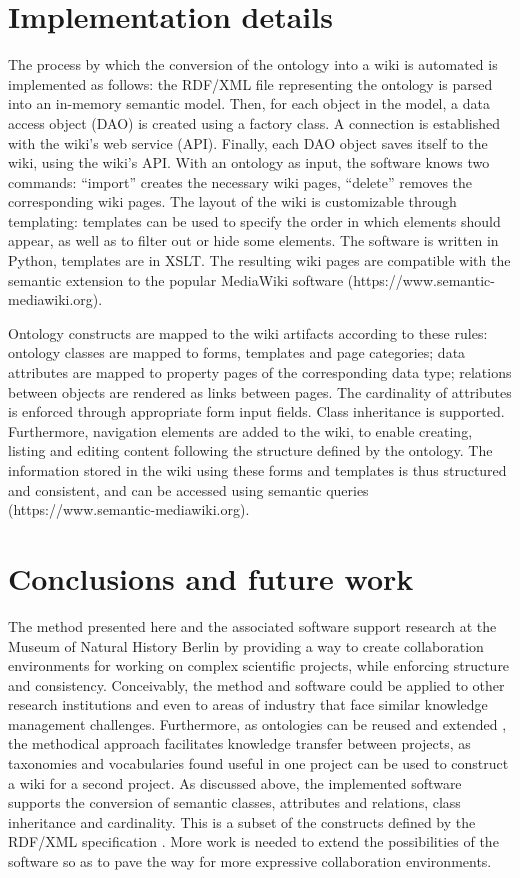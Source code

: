 \documentclass{ijcs_template}
\begin{document}
\section{Implementation details}
The process by which the conversion of the ontology into a wiki is automated is implemented as follows: the RDF/XML file representing the ontology is parsed into an in-memory semantic model. Then, for each object in the model, a data access object (DAO) is created using a factory class. A connection is established with the wiki's web service (API). Finally, each DAO object saves itself to the wiki, using the wiki's API. With an ontology as input, the software knows two commands: ``import'' creates the necessary wiki pages, ``delete'' removes the corresponding wiki pages. The layout of the wiki is customizable through templating: templates can be used to specify the order in which elements should appear, as well as to filter out or hide some elements. The software is written in Python, templates are in XSLT. The resulting wiki pages are compatible with the semantic extension to the popular MediaWiki software (https://www.semantic-mediawiki.org).

Ontology constructs are mapped to the wiki artifacts according to these rules: ontology classes are mapped to forms, templates and page categories; data attributes are mapped to property pages of the corresponding data type; relations between objects are rendered as links between pages. The cardinality of attributes is enforced through appropriate form input fields. Class inheritance is supported. Furthermore, navigation elements are added to the wiki, to enable creating, listing and editing content following the structure defined by the ontology. The information stored in the wiki using these forms and templates is thus structured and consistent, and can be accessed using semantic queries (https://www.semantic-mediawiki.org).

\section{Conclusions and future work}
The method presented here and the associated software support research at the Museum of Natural History Berlin by providing a way to create collaboration environments for working on complex scientific projects, while enforcing structure and consistency. Conceivably, the method and software could be applied to other research institutions and even to areas of industry that face similar knowledge management challenges. Furthermore, as ontologies can be reused and extended \cite{noy2001}, the methodical approach facilitates knowledge transfer between projects, as taxonomies and vocabularies found useful in one project can be used to construct a wiki for a second project. As discussed above, the implemented software supports the conversion of semantic classes, attributes and relations, class inheritance and cardinality. This is a subset of the constructs defined by the RDF/XML specification \cite{musen2015}. More work is needed to extend the possibilities of the software so as to pave the way for more expressive collaboration environments.
\end{document}
